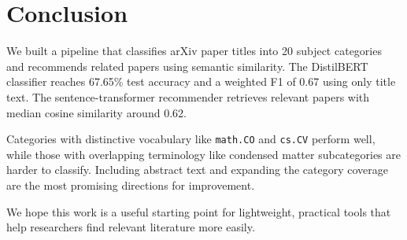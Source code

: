 \documentclass[conference]{IEEEtran}
\begin{document}
\section{Conclusion}
\label{sec:conclusion}

We built a pipeline that classifies arXiv paper titles into 20
subject categories and recommends related papers using semantic
similarity.  The DistilBERT classifier reaches 67.65\% test
accuracy and a weighted F1 of 0.67 using only title text.
The sentence-transformer recommender retrieves relevant papers
with median cosine similarity around 0.62.

Categories with distinctive vocabulary like \texttt{math.CO} and
\texttt{cs.CV} perform well, while those with overlapping
terminology like condensed matter subcategories are harder to
classify.  Including abstract text and expanding the category
coverage are the most promising directions for improvement.

We hope this work is a useful starting point for lightweight,
practical tools that help researchers find relevant literature
more easily.



\end{document}
